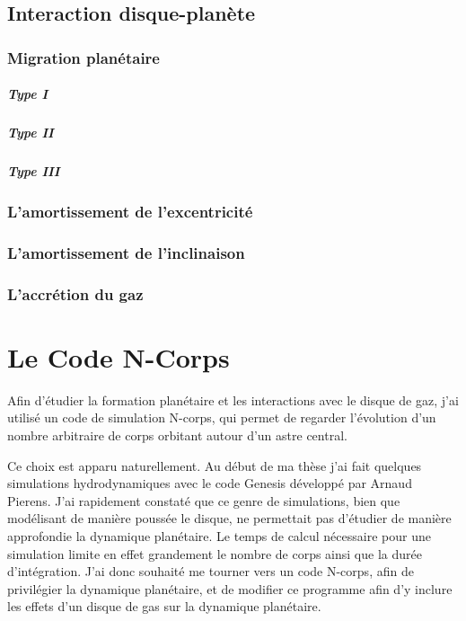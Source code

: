 \documentclass[a4paper,twoside]{report}
\begin{document}
\section{Interaction disque-planète}
\subsection{Migration planétaire}
\paragraph{Type I}
\paragraph{Type II}
\paragraph{Type III}

\subsection{L'amortissement de l'excentricité}%

\subsection{L'amortissement de l'inclinaison}%

\subsection{L'accrétion du gaz}

\chapter{Le Code N-Corps}
Afin d'étudier la formation planétaire et les interactions avec le disque de gaz, j'ai utilisé un code de simulation N-corps, qui permet de regarder l'évolution d'un nombre arbitraire de corps orbitant autour d'un astre central. 

Ce choix est apparu naturellement. Au début de ma thèse j'ai fait quelques simulations hydrodynamiques avec le code Genesis développé par Arnaud Pierens. J'ai rapidement constaté que ce genre de simulations, bien que modélisant de manière poussée le disque, ne permettait pas d'étudier de manière approfondie la dynamique planétaire. Le temps de calcul nécessaire pour une simulation limite en effet grandement le nombre de corps ainsi que la durée d'intégration. J'ai donc souhaité me tourner vers un code N-corps, afin de privilégier la dynamique planétaire, et de modifier ce programme afin d'y inclure les effets d'un disque de gas sur la dynamique planétaire. 
\end{document}
